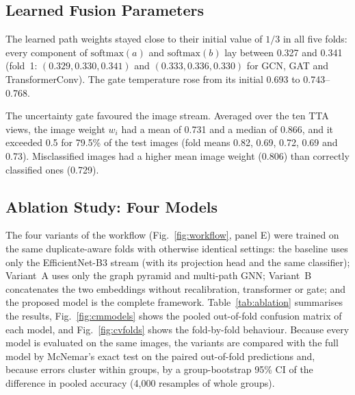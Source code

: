 \documentclass[journal,onecolumn]{IEEEtran}
\begin{document}
\subsection{Learned Fusion Parameters}\label{sec:learned}
The learned path weights stayed close to their initial value of $1/3$ in all five folds: every component of $\mathrm{softmax}(a)$ and $\mathrm{softmax}(b)$ lay between 0.327 and 0.341 (fold~1: $(0.329, 0.330, 0.341)$ and $(0.333, 0.336, 0.330)$ for GCN, GAT and TransformerConv). The gate temperature rose from its initial 0.693 to 0.743--0.768.

The uncertainty gate favoured the image stream. Averaged over the ten TTA views, the image weight $w_i$ had a mean of 0.731 and a median of 0.866, and it exceeded 0.5 for 79.5\% of the test images (fold means 0.82, 0.69, 0.72, 0.69 and 0.73). Misclassified images had a higher mean image weight (0.806) than correctly classified ones (0.729).

\subsection{Ablation Study: Four Models}\label{sec:ablation}
The four variants of the workflow (Fig.~\ref{fig:workflow}, panel E) were trained on the same duplicate-aware folds with otherwise identical settings: the baseline uses only the EfficientNet-B3 stream (with its projection head and the same classifier); Variant~A uses only the graph pyramid and multi-path GNN; Variant~B concatenates the two embeddings without recalibration, transformer or gate; and the proposed model is the complete framework. Table~\ref{tab:ablation} summarises the results, Fig.~\ref{fig:cmmodels} shows the pooled out-of-fold confusion matrix of each model, and Fig.~\ref{fig:cvfolds} shows the fold-by-fold behaviour. Because every model is evaluated on the same images, the variants are compared with the full model by McNemar's exact test on the paired out-of-fold predictions and, because errors cluster within groups, by a group-bootstrap 95\% CI of the difference in pooled accuracy (4,000 resamples of whole groups).
\end{document}
